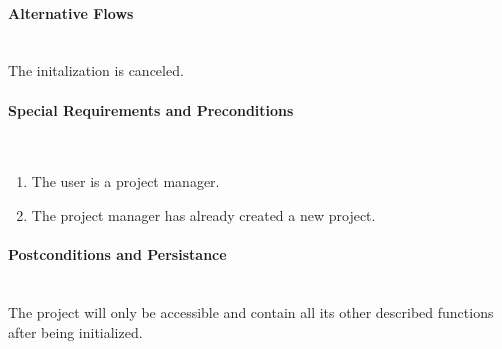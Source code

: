 \paragraph*{Alternative Flows}\mbox{}\\
The initalization is canceled.

\paragraph*{Special Requirements and Preconditions}\mbox{}\\
\begin{enumerate}
	\vspace{-3mm}
	\setlength\itemsep{-1em}
	\item The user is a project manager.
	\item The project manager has already created a new project.
\end{enumerate}

\paragraph*{Postconditions and Persistance}\mbox{}\\
The project will only be accessible and contain all its other described functions after being initialized.


